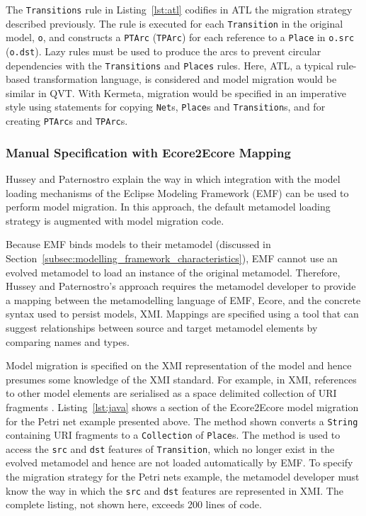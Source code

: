 The \texttt{Transitions} rule in Listing~\ref{lst:atl} codifies in ATL the migration strategy described previously. The rule is executed for each \texttt{Transition} in the original model, \texttt{o}, and constructs a \texttt{PTArc} (\texttt{TPArc}) for each reference to a \texttt{Place} in \texttt{o.src} (\texttt{o.dst}). Lazy rules must be used to produce the arcs to prevent circular dependencies with the \texttt{Transitions} and \texttt{Places} rules. Here, ATL, a typical rule-based transformation language, is considered and model migration would be similar in QVT. With Kermeta, migration would be specified in an imperative style using statements for copying \texttt{Net}s, \texttt{Place}s and \texttt{Transition}s, and for creating \texttt{PTArc}s and \texttt{TPArc}s.


\subsubsection{Manual Specification with Ecore2Ecore Mapping}
\label{subsubsec:ecore2ecore}
Hussey and Paternostro \cite{hussey06advanced} explain the way in which integration with the model loading mechanisms of the Eclipse Modeling Framework (EMF) \cite{steinberg09emf} can be used to perform model migration. In this approach, the default metamodel loading strategy is augmented with model migration code.

Because EMF binds models to their metamodel (discussed in Section~\ref{subsec:modelling_framework_characteristics}), EMF cannot use an evolved metamodel to load an instance of the original metamodel. Therefore, Hussey and Paternostro's approach requires the metamodel developer to provide a mapping between the metamodelling language of EMF, Ecore, and the concrete syntax used to persist models, XMI. Mappings are specified using a tool that can suggest relationships between source and target metamodel elements by comparing names and types.

Model migration is specified on the XMI representation of the model and hence presumes some knowledge of the XMI standard. For example, in XMI, references to other model elements are serialised as a space delimited collection of URI fragments \cite{steinberg09emf}. Listing~\ref{lst:java} shows a section of the Ecore2Ecore model migration for the Petri net example presented above. The method shown converts a \texttt{String} containing URI fragments to a \texttt{Collection} of \texttt{Place}s. The method is used to access the \texttt{src} and \texttt{dst} features of \texttt{Transition}, which no longer exist in the evolved metamodel and hence are not loaded automatically by EMF. To specify the migration strategy for the Petri nets example, the metamodel developer must know the way in which the \texttt{src} and \texttt{dst} features are represented in XMI. The complete listing, not shown here, exceeds 200 lines of code.

